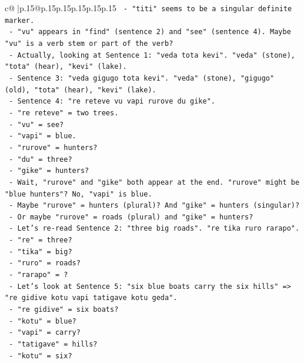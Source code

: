 \documentclass{article}
\begin{document}
{\begin{supertabular}{c@{$\;$}|p{.15\linewidth}@{}p{.15\linewidth}p{.15\linewidth}p{.15\linewidth}p{.15\linewidth}p{.15\linewidth}}
{{{\texttt{      {-} "titi" seems to be a singular definite marker.} \\
\texttt{      {-} "vu" appears in "find" (sentence 2) and "see" (sentence 4). Maybe "vu" is a verb stem or part of the verb?} \\
\texttt{      {-} Actually, looking at Sentence 1: "veda tota kevi". "veda" (stone), "tota" (hear), "kevi" (lake).} \\
\texttt{      {-} Sentence 3: "veda gigugo tota kevi". "veda" (stone), "gigugo" (old), "tota" (hear), "kevi" (lake).} \\
\texttt{      {-} Sentence 4: "re reteve vu vapi rurove du gike".} \\
\texttt{        {-} "re reteve" = two trees.} \\
\texttt{        {-} "vu" = see?} \\
\texttt{        {-} "vapi" = blue.} \\
\texttt{        {-} "rurove" = hunters?} \\
\texttt{        {-} "du" = three?} \\
\texttt{        {-} "gike" = hunters?} \\
\texttt{      {-} Wait, "rurove" and "gike" both appear at the end. "rurove" might be "blue hunters"? No, "vapi" is blue.} \\
\texttt{      {-} Maybe "rurove" = hunters (plural)? And "gike" = hunters (singular)?} \\
\texttt{      {-} Or maybe "rurove" = roads (plural) and "gike" = hunters?} \\
\texttt{      {-} Let's re{-}read Sentence 2: "three big roads". "re tika ruro rarapo".} \\
\texttt{        {-} "re" = three?} \\
\texttt{        {-} "tika" = big?} \\
\texttt{        {-} "ruro" = roads?} \\
\texttt{        {-} "rarapo" = ?} \\
\texttt{      {-} Let's look at Sentence 5: "six blue boats carry the six hills" => "re gidive kotu vapi tatigave kotu geda".} \\
\texttt{        {-} "re gidive" = six boats?} \\
\texttt{        {-} "kotu" = blue?} \\
\texttt{        {-} "vapi" = carry?} \\
\texttt{        {-} "tatigave" = hills?} \\
\texttt{        {-} "kotu" = six?} \\
}}}
\end{supertabular}}
\end{document}
